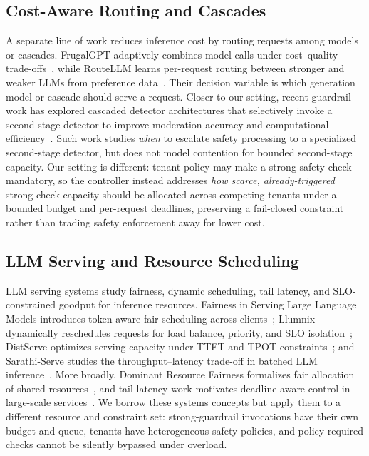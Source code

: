 \documentclass[conference]{IEEEtran}
\begin{document}
\subsection{Cost-Aware Routing and Cascades}

A separate line of work reduces inference cost by routing requests among models or cascades. FrugalGPT adaptively combines model calls under cost--quality trade-offs~\cite{chen2024frugalgpt}, while RouteLLM learns per-request routing between stronger and weaker LLMs from preference data~\cite{ong2025routellm}. Their decision variable is which generation model or cascade should serve a request. Closer to our setting, recent guardrail work has explored cascaded detector architectures that selectively invoke a second-stage detector to improve moderation accuracy and computational efficiency~\cite{nagireddy2025cascade}. Such work studies \emph{when} to escalate safety processing to a specialized second-stage detector, but does not model contention for bounded second-stage capacity. Our setting is different: tenant policy may make a strong safety check mandatory, so the controller instead addresses \emph{how scarce, already-triggered} strong-check capacity should be allocated across competing tenants under a bounded budget and per-request deadlines, preserving a fail-closed constraint rather than trading safety enforcement away for lower cost.

\subsection{LLM Serving and Resource Scheduling}

LLM serving systems study fairness, dynamic scheduling, tail latency, and SLO-constrained goodput for inference resources. Fairness in Serving Large Language Models introduces token-aware fair scheduling across clients~\cite{sheng2024fairness}; Llumnix dynamically reschedules requests for load balance, priority, and SLO isolation~\cite{sun2024llumnix}; DistServe optimizes serving capacity under TTFT and TPOT constraints~\cite{zhong2024distserve}; and Sarathi-Serve studies the throughput--latency trade-off in batched LLM inference~\cite{agrawal2024sarathi}. More broadly, Dominant Resource Fairness formalizes fair allocation of shared resources~\cite{ghodsi2011drf}, and tail-latency work motivates deadline-aware control in large-scale services~\cite{dean2013tail}. We borrow these systems concepts but apply them to a different resource and constraint set: strong-guardrail invocations have their own budget and queue, tenants have heterogeneous safety policies, and policy-required checks cannot be silently bypassed under overload.
\end{document}
